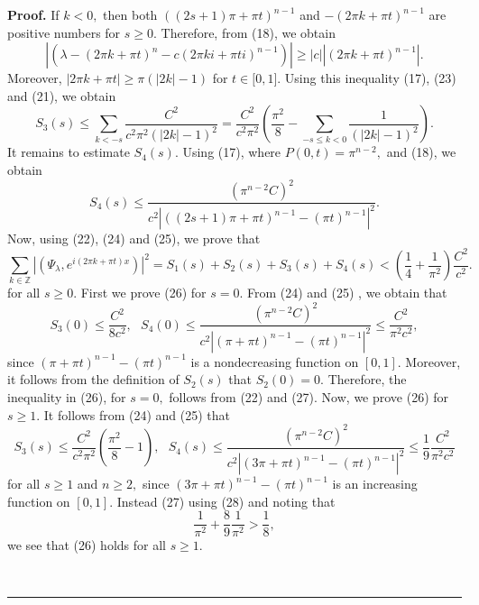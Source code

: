 \documentclass{article}%
\newenvironment{proof}[1][Proof]{\textbf{#1.} }{\ \rule{0.5em}{0.5em}}
\begin{document}
\begin{proof}
If $k<0,$ then both $((2s+1)\pi+\pi t)^{n-1}$ and $-(2\pi k+\pi t)^{n-1}$ are
positive numbers for $s\geq0.$ Therefore, from (18), we obtain
\begin{equation}
\left\vert \left(  \lambda-\left(  2\pi k+\pi t\right)  ^{n}-c(2\pi ki+\pi
ti)^{n-1}\right)  \right\vert \geq\left\vert c\right\vert \left\vert (2\pi
k+\pi t)^{n-1}\right\vert . \tag{23}%
\end{equation}
Moreover, $\left\vert 2\pi k+\pi t\right\vert \geq\pi\left(  \left\vert
2k\right\vert -1\right)  $ for $t\in\lbrack0,1].$ Using this inequality (17),
(23) and (21), we obtain
\begin{equation}
S_{3}(s)\leq\sum_{k<-s}\frac{C^{2}}{c^{2}\pi^{2}(\left\vert 2k\right\vert
-1)^{2}}=\frac{C^{2}}{c^{2}\pi^{2}}\left(  \frac{\pi^{2}}{8}-\sum_{-s\leq
k<0}\frac{1}{(\left\vert 2k\right\vert -1)^{2}}\right)  . \tag{24}%
\end{equation}
It remains to estimate $S_{4}(s).$ Using (17), where $P(0,t)=\pi^{n-2},$ and
(18), we obtain
\begin{equation}
S_{4}(s)\leq\frac{\left(  \pi^{n-2}C\right)  ^{2}}{c^{2}\left\vert
((2s+1)\pi+\pi t)^{n-1}-(\pi t)^{n-1}\right\vert ^{2}}. \tag{25}%
\end{equation}
Now, using (22), (24) and (25), we prove that%
\begin{equation}
\sum_{k\in\mathbb{Z}}\left\vert \left(  \Psi_{\lambda},e^{i\left(  2\pi k+\pi
t\right)  x}\right)  \right\vert ^{2}=S_{1}(s)+S_{2}(s)+S_{3}(s)+S_{4}%
(s)<(\frac{1}{4}+\frac{1}{\pi^{2}})\frac{C^{2}}{c^{2}}. \tag{26}%
\end{equation}
for all $s\geq0.$ First we prove (26) for $s=0.$ From (24) and (25) , we
obtain that
\begin{equation}
S_{3}(0)\leq\frac{C^{2}}{8c^{2}},\text{ }S_{4}(0)\leq\frac{\left(  \pi
^{n-2}C\right)  ^{2}}{c^{2}\left\vert (\pi+\pi t)^{n-1}-(\pi t)^{n-1}%
\right\vert ^{2}}\leq\frac{C^{2}}{\pi^{2}c^{2}}, \tag{27}%
\end{equation}
since $(\pi+\pi t)^{n-1}-(\pi t)^{n-1}$ is a nondecreasing function on
$[0,1].$ Moreover, it follows from the definition of $S_{2}(s)$ that
$S_{2}(0)=0.$ Therefore, the inequality in (26), for $s=0,$ follows from (22)
and (27). Now, we prove (26) for $s\geq1.$ It follows from (24) and (25) that
\begin{equation}
S_{3}(s)\leq\frac{C^{2}}{c^{2}\pi^{2}}\left(  \frac{\pi^{2}}{8}-1\right)
,\text{ }S_{4}(s)\leq\frac{\left(  \pi^{n-2}C\right)  ^{2}}{c^{2}\left\vert
(3\pi+\pi t)^{n-1}-(\pi t)^{n-1}\right\vert ^{2}}\leq\frac{1}{9}\frac{C^{2}%
}{\pi^{2}c^{2}} \tag{28}%
\end{equation}
for all $s\geq1$ and $n\geq2,$ since $(3\pi+\pi t)^{n-1}-(\pi t)^{n-1}$ is an
increasing function on $[0,1].$ Instead (27) using (28) and noting that
\[
\frac{1}{\pi^{2}}+\frac{8}{9}\frac{1}{\pi^{2}}>\frac{1}{8},
\]
we see that (26) holds for all $s\geq1.$


\end{proof}
\end{document}
